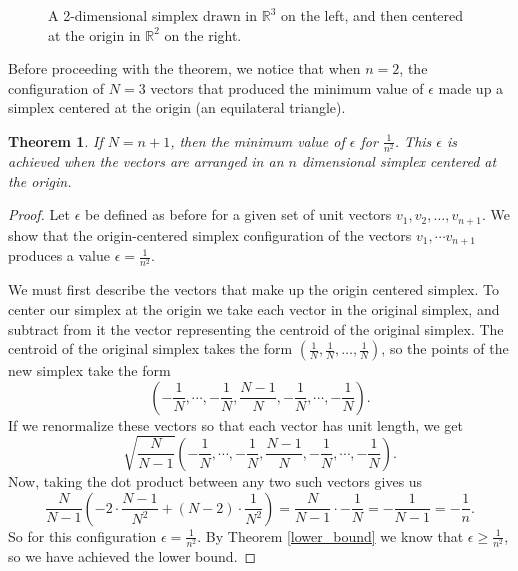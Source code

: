 \documentclass[11pt,letterpaper,twoside,english]{article}
\theoremstyle{theorem}
\newtheorem{theorem}{Theorem}[section]
\theoremstyle{remark}
\providecommand{\R}{\mathbb{R}}
\begin{document}
\begin{figure}[!h]

    \caption{A 2-dimensional simplex drawn in $\R^3$ on the left, and then centered at the origin in $\R^2$ on the right.}
\end{figure}

Before proceeding with the theorem, we notice that when $n=2$, the configuration of $N=3$ vectors that produced the minimum value of $\epsilon$ made up a simplex centered at the origin (an equilateral triangle). 


\begin{theorem}
If $N=n+1$, then the minimum value of $\epsilon$ for $\frac{1}{n^2}$. This $\epsilon$ is achieved when the vectors are arranged in an $n$ dimensional simplex centered at the origin.
\label{simplex}
\end{theorem}

\begin{proof}
Let $\epsilon$ be defined as before for a given set of unit vectors $v_1, v_2, \ldots, v_{n+1}$. We show that the origin-centered simplex configuration of the vectors $v_1,\cdots v_{n+1}$ produces a value $\epsilon=\frac{1}{n^2}$. 

We must first describe the vectors that make up the origin centered simplex. To center our simplex at the origin we take each vector in the original simplex, and subtract from it the vector representing the centroid of the original simplex. The centroid of the original simplex takes the form $(\frac{1}{N},\frac{1}{N},\ldots,\frac{1}{N})$, so the points of the new simplex take the form
$$
\left(-\frac{1}{N},\cdots,-\frac{1}{N},\frac{N-1}{N},-\frac{1}{N},\cdots,-\frac{1}{N}\right).
$$
If we renormalize these vectors so that each vector has unit length, we get 
$$
\sqrt{\frac{N}{N-1}}\left(-\frac{1}{N},\cdots,-\frac{1}{N},\frac{N-1}{N},-\frac{1}{N},\cdots,-\frac{1}{N}\right).
$$
Now, taking the dot product between any two such vectors gives us
$$
\frac{N}{N-1}\left(-2\cdot\frac{N-1}{N^2}+(N-2)\cdot\frac{1}{N^2}\right)=\frac{N}{N-1}\cdot-\frac{1}{N}=-\frac{1}{N-1}=-\frac{1}{n}.
$$
So for this configuration $\epsilon=\frac{1}{n^2}$. By Theorem \ref{lower_bound} we know that $\epsilon\ge \frac{1}{n^2}$, so we have achieved the lower bound. 
\end{proof}
\end{document}
